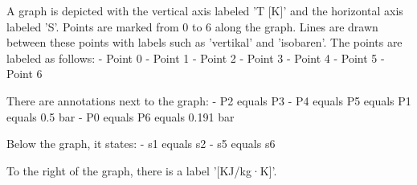 A graph is depicted with the vertical axis labeled 'T [K]' and the horizontal axis labeled 'S'. Points are marked from 0 to 6 along the graph. Lines are drawn between these points with labels such as 'vertikal' and 'isobaren'. The points are labeled as follows:
- Point 0
- Point 1
- Point 2
- Point 3
- Point 4
- Point 5
- Point 6

There are annotations next to the graph:
- P2 equals P3
- P4 equals P5 equals P1 equals 0.5 bar
- P0 equals P6 equals 0.191 bar

Below the graph, it states:
- s1 equals s2
- s5 equals s6

To the right of the graph, there is a label '[KJ/kg·K]'.